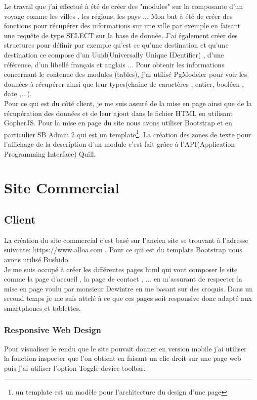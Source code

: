 \documentclass[12pt,a4paper]{report}
\begin{document}
Le travail que j'ai effectué à été de créer des "modules" sur la composante d'un voyage comme les villes , les régions, les pays ... Mon but à été de créer des fonctions pour récupérer des informations sur une ville par exemple en faisant une requête de type SELECT sur la base de donnée. J'ai également créer des structures pour définir par exemple qu'est ce qu'une destination et qu'une destination ce compose d'un Uuid(Universally Unique IDentifier) , d'une référence, d'un libellé  français et anglais ... Pour obtenir les informations concernant le contenue des modules (tables), j'ai utilisé PgModeler pour voir les données à récupérer ainsi que leur types(chaine de caractères , entier, booléen , date ,...).\\

Pour ce qui est du côté client, je me suis assuré de la mise en page ainsi que de la  récupération des données et de leur ajout dans le fichier HTML en utilisant GopherJS. Pour la mise en page du site nous avons utiliser Bootstrap et en particulier SB Admin 2 qui est un template\footnote{un template est un modèle pour l'architecture du design d'une page }. La création des zones de texte pour l'affichage de la description d'un module c'est fait grâce à l'API(Application Programming Interface) Quill.

\newpage
\section{Site Commercial}

\subsection{Client}

La création du site commercial c'est basé sur l'ancien site  se trouvant à l'adresse suivante: https://www.alloa.com . Pour ce qui est du template Bootstrap nous avons utilisé Bushido. \\

 Je me suis occupé à créer les différentes pages html qui vont composer le site comme la page d'accueil , la page de contact , ... en m'assurant de respecter la mise en page voulu par monsieur Dewintre en me basant sur des croquis. Dans un second temps je me suis attelé à ce que ces pages soit responsive donc adapté aux smartphones et tablettes.\\




\subsubsection{Responsive Web Design}
Pour visualiser le rendu que le site pouvait donner en version mobile j'ai utiliser la fonction inspecter que l'on obtient en faisant un clic droit sur une page web puis j'ai utiliser l'option Toggle device toolbar.\\
\end{document}
